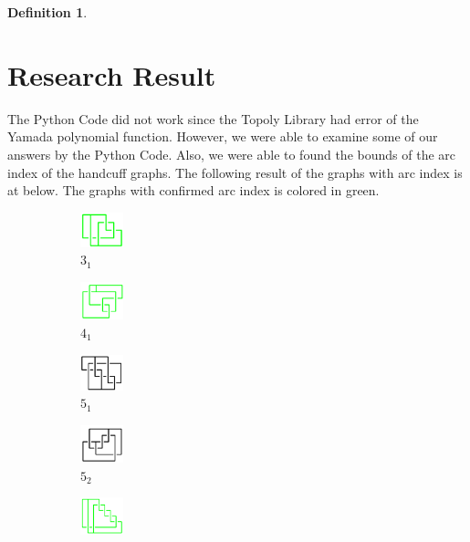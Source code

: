 \documentclass{article}
\theoremstyle{definition}
\newtheorem{defn}[thm]{Definition}
\theoremstyle{theorem}
\theoremstyle{proposition}
\theoremstyle{corollary}
\begin{document}
\begin{defn}
\section{Research Result}
The Python Code did not work since the Topoly Library had error of the Yamada polynomial function. However, we were able to examine some of our answers by the Python Code. Also, we were able to found the bounds of the arc index of the handcuff graphs. The following result of the graphs with arc index is at below. The graphs with confirmed arc index is colored in green.\\
  \begin{figure}[H]
    \begin{subfigure}{0.075\textwidth}
    \includegraphics[width=1.25cm]{../Midterm_Poster/grid_diagram/theta_3_1.png}
    \caption{$3_1$} 
    \end{subfigure}
    \begin{subfigure}{0.075\textwidth}
    \includegraphics[width=1.25cm]{../Midterm_Poster/grid_diagram/theta_4_1.png}
    \caption{$4_1$} 
    \end{subfigure}
    \begin{subfigure}{0.075\textwidth}
    \includegraphics[width=1.25cm]{../Midterm_Poster/grid_diagram/theta_5_1.png}
    \caption{$5_1$}
    \end{subfigure}
    \begin{subfigure}{0.075\textwidth}
    \includegraphics[width=1.25cm]{../Midterm_Poster/grid_diagram/theta_5_2.png}
    \caption{$5_2$} 
    \end{subfigure}
    \begin{subfigure}{0.075\textwidth}
    \includegraphics[width=1.25cm]{../Midterm_Poster/grid_diagram/theta_5_3.png}

\end{subfigure}
\end{figure}
\end{defn}
\end{document}
